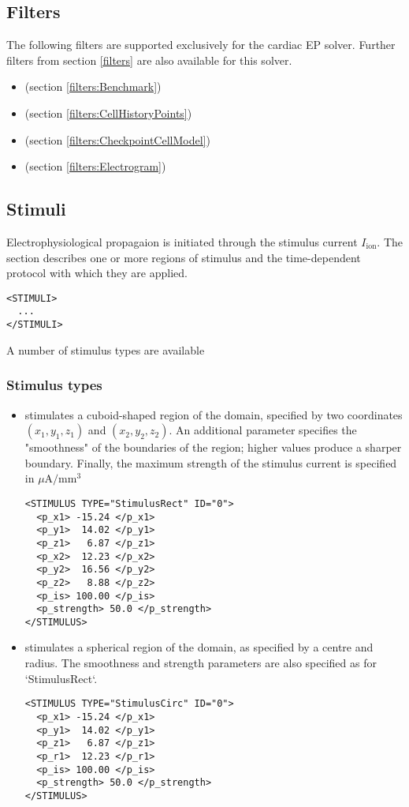 \subsection{Filters}
The following filters are supported exclusively for the cardiac
EP solver. Further filters from section \ref{filters} are also available
for this solver.
\begin{itemize}
    \item {} (section \ref{filters:Benchmark})
    \item {} (section \ref{filters:CellHistoryPoints})
    \item {} (section \ref{filters:CheckpointCellModel})
    \item {} (section \ref{filters:Electrogram})
\end{itemize}

\subsection{Stimuli}
Electrophysiological propagaion is initiated through the stimulus current 
$I_{\mathrm{ion}}$. The  section describes one or more regions of
stimulus and the time-dependent protocol with which they are applied.
\begin{lstlisting}[style=XmlStyle]
<STIMULI>
  ...
</STIMULI>
\end{lstlisting}
A number of stimulus types are available

\subsubsection{Stimulus types}
\begin{itemize}
    \item {} stimulates a cuboid-shaped region of the domain,
    specified by two coordinates $(x_1,y_1,z_1)$ and $(x_2,y_2,z_2)$.
    An additional parameter specifies the "smoothness" of the boundaries of the
    region; higher values produce a sharper boundary. Finally, the maximum 
    strength of the stimulus current is specified in $\mu \mathrm{A} / \mathrm{mm}^3$
\begin{lstlisting}[style=XmlStyle]
<STIMULUS TYPE="StimulusRect" ID="0">
  <p_x1> -15.24 </p_x1>
  <p_y1>  14.02 </p_y1>
  <p_z1>   6.87 </p_z1>
  <p_x2>  12.23 </p_x2>
  <p_y2>  16.56 </p_y2>
  <p_z2>   8.88 </p_z2>
  <p_is> 100.00 </p_is>
  <p_strength> 50.0 </p_strength>
</STIMULUS>
\end{lstlisting}

    \item {} stimulates a spherical region of the domain, as
    specified by a centre and radius. The smoothness and strength parameters are also specified as for `StimulusRect`.
\begin{lstlisting}[style=XmlStyle]
<STIMULUS TYPE="StimulusCirc" ID="0">
  <p_x1> -15.24 </p_x1>
  <p_y1>  14.02 </p_y1>
  <p_z1>   6.87 </p_z1>
  <p_r1>  12.23 </p_r1>
  <p_is> 100.00 </p_is>
  <p_strength> 50.0 </p_strength>
</STIMULUS>
\end{lstlisting}
\end{itemize}


